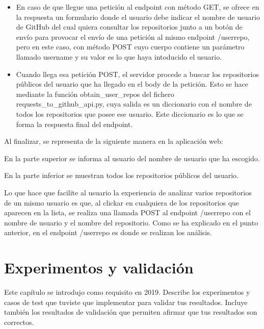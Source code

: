 \documentclass[a4paper, 12pt]{book}
\begin{document}
\begin{itemize}
  \item En caso de que llegue una petición al endpoint con método GET, se ofrece en la respuesta un formulario donde el usuario debe indicar el nombre de usuario de GitHub del cual quiera consultar los repositorios junto a un botón de envío para provocar el envío de una petición al mismo endpoint /userrepo, pero en este caso, con método POST cuyo cuerpo contiene un parámetro llamado username y su valor es lo que haya intoducido el usuario.
  \item Cuando llega esa petición POST, el servidor procede a buscar los repositorios públicos del usuario que ha llegado en el body de la petición. Esto se hace mediante la función obtain\_user\_repos del fichero requests\_to\_github\_api.py, cuya salida es un diccionario con el nombre de todos los repositorios que posee ese usuario. Este diccionario es lo que se forma la respuesta final del endpoint.
\end{itemize}

Al finalizar, se representa de la siguiente manera en la aplicación web:

En la parte superior se informa al usuario del nombre de usuario que ha escogido.

En la parte inferior se muestran todos los repositorios públicos del usuario.

Lo que hace que facilite al usuario la experiencia de analizar varios repositorios de un mismo usuario es que, al clickar en cualquiera de los repositorios que aparecen en la lista, se realiza una llamada POST al endpoint /userrepo con el nombre de usuario y el nombre del repositorio. Como se ha explicado en el punto anterior, en el endpoint /userrepo es donde se realizan los análisis. 




\cleardoublepage
\chapter{Experimentos y validación}
\label{chap:experimentos}

Este capítulo se introdujo como requisito en 2019. 
Describe los experimentos y casos de test que tuviste que implementar para validar tus resultados. 
Incluye también los resultados de validación que permiten afirmar que tus resultados son correctos. 
\end{document}
